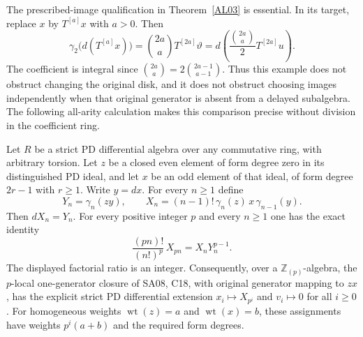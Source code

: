 The prescribed-image qualification in Theorem~\ref{AL03} is
essential.  In its target, replace $x$ by $T^{[a]}x$ with
$a>0$.  Then
\[
 \gamma_2\bigl(d(T^{[a]}x)\bigr)
   =\binom{2a}{a}T^{[2a]}\vartheta
   =d\left(\frac{\binom{2a}{a}}{2}T^{[2a]}u\right).
 \tag{AL.19}
\]
The coefficient is integral since
$\binom{2a}{a}=2\binom{2a-1}{a-1}$.
Thus this example does not obstruct changing the original disk,
and it does not obstruct choosing images independently when
that original generator is absent from a delayed subalgebra.
The following all-arity calculation makes this comparison
precise without division in the coefficient ring.

\begin{proposition}
\label{AL04}
Let $R$ be a strict PD differential algebra over any commutative
ring, with arbitrary torsion.  Let $z$ be a closed even element
of form degree zero in its distinguished PD ideal, and let
$x$ be an odd element of that ideal, of form degree $2r-1$
with $r\geq1$.  Write $y=dx$.  For every $n\geq1$ define
\[
 Y_n=\gamma_n(zy),\qquad
 X_n=(n-1)!\,\gamma_n(z)\,x\,\gamma_{n-1}(y).
 \tag{AL.20}
\]
Then $dX_n=Y_n$.  For every positive integer $p$ and every
$n\geq1$ one has the exact identity
\[
 \frac{(pn)!}{(n!)^p}\,X_{pn}
       =X_nY_n^{p-1}.
 \tag{AL.21}
\]
The displayed factorial ratio is an integer.
Consequently, over a $\mathbb Z_{(p)}$-algebra, the $p$-local
one-generator closure of SA08, C18, with original generator
mapping to $zx$, has the explicit
strict PD differential extension
$x_i\mapsto X_{p^i}$ and $v_i\mapsto0$ for all $i\geq0$.
For homogeneous weights $\operatorname{wt}(z)=a$ and
$\operatorname{wt}(x)=b$, these assignments have weights
$p^i(a+b)$ and the required form degrees.
\end{proposition}

